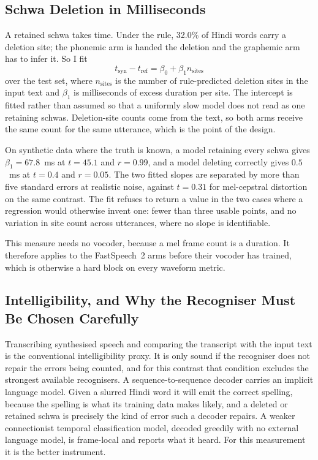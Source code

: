 \documentclass[runningheads]{llncs}
\begin{document}
\subsection{Schwa Deletion in Milliseconds}
\label{sec:duration}

A retained schwa takes time. Under the rule, 32.0\% of Hindi words carry a
deletion site; the phonemic arm is handed the deletion and the graphemic arm
has to infer it. So I fit
\begin{equation}
t_{\text{syn}} - t_{\text{ref}} = \beta_0 + \beta_1 n_{\text{sites}}
\end{equation}
over the test set, where $n_{\text{sites}}$ is the number of rule-predicted
deletion sites in the input text and $\beta_1$ is milliseconds of excess
duration per site. The intercept is fitted rather than assumed so that a
uniformly slow model does not read as one retaining schwas. Deletion-site
counts come from the text, so both arms receive the same count for the same
utterance, which is the point of the design.

On synthetic data where the truth is known, a model retaining every schwa
gives $\beta_1 = 67.8$~ms at $t = 45.1$ and $r = 0.99$, and a model deleting
correctly gives $0.5$~ms at $t = 0.4$ and $r = 0.05$. The two fitted slopes
are separated by more than five standard errors at realistic noise, against
$t = 0.31$ for mel-cepstral distortion on the same contrast. The fit refuses
to return a value in the two cases where a regression would otherwise invent
one: fewer than three usable points, and no variation in site count across
utterances, where no slope is identifiable.

This measure needs no vocoder, because a mel frame count is a duration. It
therefore applies to the FastSpeech~2 arms before their vocoder has trained,
which is otherwise a hard block on every waveform metric.

\subsection{Intelligibility, and Why the Recogniser Must Be Chosen Carefully}
\label{sec:intel}

Transcribing synthesised speech and comparing the transcript with the input
text is the conventional intelligibility proxy. It is only sound if the
recogniser does not repair the errors being counted, and for this contrast
that condition excludes the strongest available recognisers. A
sequence-to-sequence decoder carries an implicit language model. Given a
slurred Hindi word it will emit the correct spelling, because the spelling is
what its training data makes likely, and a deleted or retained schwa is
precisely the kind of error such a decoder repairs. A weaker connectionist
temporal classification model, decoded greedily with no external language
model, is frame-local and reports what it heard. For this measurement it is
the better instrument.
\end{document}
